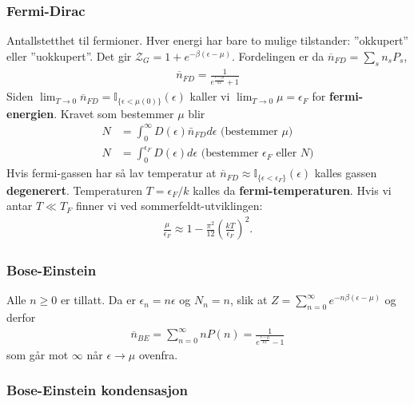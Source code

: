 \documentclass[a4paper, norsk, 10pt]{article}
\newcommand{\EQU}[1] { \begin{equation*} \begin{split}
#1  
\end{split} \end{equation*} }
\begin{document}
\begin{multicols*}{2}
\subsubsection*{Fermi-Dirac}
Antallstetthet til fermioner. Hver energi har bare to mulige tilstander:  ''okkupert'' eller ''uokkupert''. Det gir $\mathcal{Z}_G=1+e^{-\beta(\epsilon-\mu)}$. Fordelingen er da $\overline{n}_{FD}=\sum_s n_s P_s $,
\EQU{
\overline{n}_{FD} = \frac{1}{e^{\frac{\epsilon-\mu}{kT}}+1}
}
Siden $\lim_{T\rightarrow 0}\overline{n}_{FD}=\mathbb{I}_{\{ \epsilon< \mu(0) \} }(\epsilon)$ kaller vi $\lim_{T\rightarrow 0}\mu = \epsilon_F$ for \textbf{fermi-energien}. Kravet som bestemmer $\mu$ blir 
\EQU{
N &= \int_0^\infty D(\epsilon)\bar{n}_{FD}d\epsilon \text{ (bestemmer $\mu$)} \\
N &= \int_0^{\epsilon_F} D(\epsilon)d\epsilon \text{ (bestemmer $\epsilon_F$ eller $N$)}
}
Hvis fermi-gassen har så lav temperatur at $\overline{n}_{FD} \approx \mathbb{I}_{\{\epsilon<\epsilon_F\}}(\epsilon)$ kalles gassen \textbf{degenerert}. Temperaturen $T=\epsilon_F/k$ kalles da \textbf{fermi-temperaturen}. Hvis vi antar $T\ll T_F$ finner vi ved sommerfeldt-utviklingen:
\EQU{
\frac{\mu}{\epsilon_F} \approx 1-\frac{\pi^2}{12}\left( \frac{kT}{\epsilon_F} \right)^2.
}


\subsubsection*{Bose-Einstein}
Alle $n\geq 0$ er tillatt. Da er $\epsilon_n=n\epsilon$ og $N_n = n$, slik at $Z=\sum_{n=0}^\infty e^{-n \beta\left( \epsilon-\mu\right)}$ og derfor
\EQU{
\overline{n}_{BE} = \sum_{n=0}^\infty n P(n) = \frac{1}{e^{\frac{\epsilon-\mu}{kT}}-1}
}
som går mot $\infty$ når $\epsilon \rightarrow \mu$ ovenfra.  

\subsubsection*{Bose-Einstein kondensasjon}



\end{multicols*}
\end{document}
